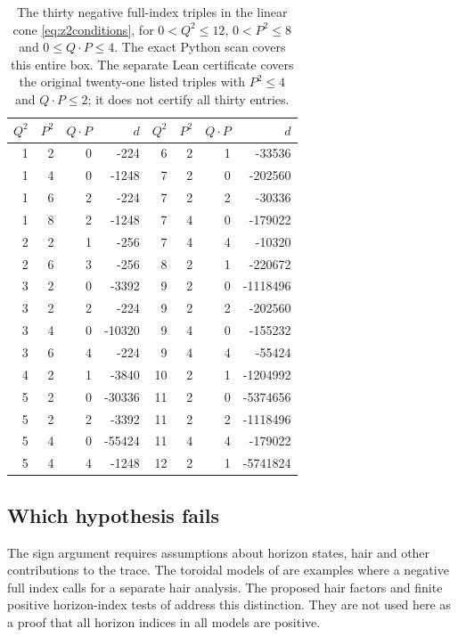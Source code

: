 \begin{table}[tbp]
\centering\scriptsize
\begin{tabular}{@{}rrrr@{\quad}rrrr@{}}
\toprule
$Q^2$&$P^2$&$Q\cdot P$&$d$&$Q^2$&$P^2$&$Q\cdot P$&$d$\\
\midrule
1 & 2 & 0 & -224 & 6 & 2 & 1 & -33536 \\
1 & 4 & 0 & -1248 & 7 & 2 & 0 & -202560 \\
1 & 6 & 2 & -224 & 7 & 2 & 2 & -30336 \\
1 & 8 & 2 & -1248 & 7 & 4 & 0 & -179022 \\
2 & 2 & 1 & -256 & 7 & 4 & 4 & -10320 \\
2 & 6 & 3 & -256 & 8 & 2 & 1 & -220672 \\
3 & 2 & 0 & -3392 & 9 & 2 & 0 & -1118496 \\
3 & 2 & 2 & -224 & 9 & 2 & 2 & -202560 \\
3 & 4 & 0 & -10320 & 9 & 4 & 0 & -155232 \\
3 & 6 & 4 & -224 & 9 & 4 & 4 & -55424 \\
4 & 2 & 1 & -3840 & 10 & 2 & 1 & -1204992 \\
5 & 2 & 0 & -30336 & 11 & 2 & 0 & -5374656 \\
5 & 2 & 2 & -3392 & 11 & 2 & 2 & -1118496 \\
5 & 4 & 0 & -55424 & 11 & 4 & 4 & -179022 \\
5 & 4 & 4 & -1248 & 12 & 2 & 1 & -5741824 \\
\bottomrule
\end{tabular}
\caption{The thirty negative full-index triples in the linear cone \eqref{eq:z2conditions}, for $0<Q^2\le12$, $0<P^2\le8$ and $0\le Q\cdot P\le4$. The exact Python scan covers this entire box. The separate Lean certificate covers the original twenty-one listed triples with $P^2\le4$ and $Q\cdot P\le2$; it does not certify all thirty entries.}
\label{tab:violations}
\end{table}

\subsection{Which hypothesis fails}\label{ssec:hair}

The sign argument requires assumptions about horizon states, hair and other contributions to the trace. The toroidal models of \cite{CD19} are examples where a negative full index calls for a separate hair analysis. The proposed hair factors and finite positive horizon-index tests of \cite{CD21} address this distinction. They are not used here as a proof that all horizon indices in all models are positive.

